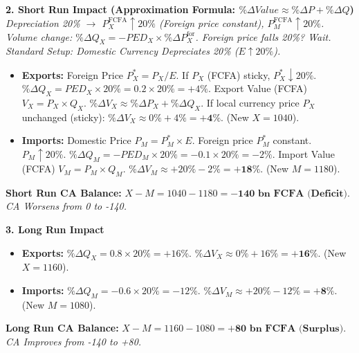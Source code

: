 \documentclass[11pt]{article}
\begin{document}
\begin{exoresolu}
\textbf{2. Short Run Impact (Approximation Formula: $\% \Delta Value \approx \% \Delta P + \% \Delta Q$)}
\textit{Depreciation 20\% $\rightarrow$ $P_X^{\text{FCFA}} \uparrow 20\%$ (Foreign price constant), $P_M^{\text{FCFA}} \uparrow 20\%$.}
\textit{Volume change: $\% \Delta Q_X = -PED_X \times \% \Delta P_X^{\text{for}}$. Foreign price falls 20\%? Wait.}
\textit{Standard Setup: Domestic Currency Depreciates 20\% ($E \uparrow 20\%$).}
\begin{itemize}
    \item \textbf{Exports:} Foreign Price $P_X^* = P_X / E$. If $P_X$ (FCFA) sticky, $P_X^* \downarrow 20\%$. $\% \Delta Q_X = PED_X \times 20\% = 0.2 \times 20\% = +4\%$.
    Export Value (FCFA) $V_X = P_X \times Q_X$. $\% \Delta V_X \approx \% \Delta P_X + \% \Delta Q_X$.
    If local currency price $P_X$ unchanged (sticky): $\% \Delta V_X \approx 0\% + 4\% = \mathbf{+4\%}$.
    (New $X = 1040$).
    \item \textbf{Imports:} Domestic Price $P_M = P_M^* \times E$. Foreign price $P_M^*$ constant. $P_M \uparrow 20\%$.
    $\% \Delta Q_M = -PED_M \times 20\% = -0.1 \times 20\% = -2\%$.
    Import Value (FCFA) $V_M = P_M \times Q_M$. $\% \Delta V_M \approx +20\% - 2\% = \mathbf{+18\%}$.
    (New $M = 1180$).
\end{itemize}
\textbf{Short Run CA Balance:} $X - M = 1040 - 1180 = \mathbf{-140 \text{ bn FCFA (Deficit)}}$.
\textit{CA Worsens from 0 to -140.}

\textbf{3. Long Run Impact}
\begin{itemize}
    \item \textbf{Exports:} $\% \Delta Q_X = 0.8 \times 20\% = +16\%$. $\% \Delta V_X \approx 0\% + 16\% = \mathbf{+16\%}$. (New $X = 1160$).
    \item \textbf{Imports:} $\% \Delta Q_M = -0.6 \times 20\% = -12\%$. $\% \Delta V_M \approx +20\% - 12\% = \mathbf{+8\%}$. (New $M = 1080$).
\end{itemize}
\textbf{Long Run CA Balance:} $X - M = 1160 - 1080 = \mathbf{+80 \text{ bn FCFA (Surplus)}}$.
\textit{CA Improves from -140 to +80.}


\end{exoresolu}
\end{document}
